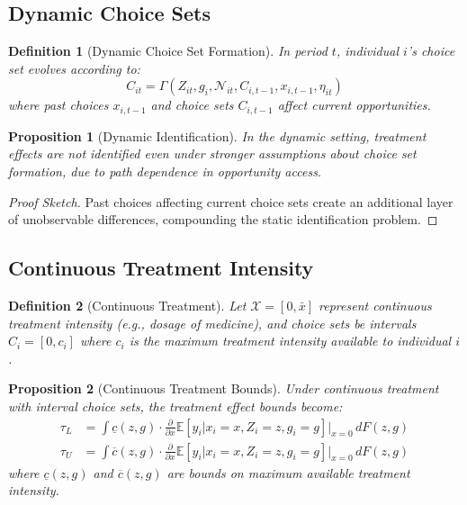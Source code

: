 \documentclass{article}
\newtheorem{proposition}{Proposition}
\newtheorem{definition}{Definition}
\newcommand{\E}{\mathbb{E}}
\newcommand{\X}{\mathcal{X}}
\begin{document}
\subsection{Dynamic Choice Sets}

\begin{definition}[Dynamic Choice Set Formation]
In period $t$, individual $i$'s choice set evolves according to:
\begin{equation}
C_{it} = \Gamma(Z_{it}, g_i, \mathcal{N}_{it}, C_{i,t-1}, x_{i,t-1}, \eta_{it}) %
\end{equation}
where past choices $x_{i,t-1}$ and choice sets $C_{i,t-1}$ affect current opportunities.
\end{definition}

\begin{proposition}[Dynamic Identification]
In the dynamic setting, treatment effects are not identified even under stronger assumptions about choice set formation, due to path dependence in opportunity access. %
\end{proposition}

\begin{proof}[Proof Sketch]
Past choices affecting current choice sets create an additional layer of unobservable differences, compounding the static identification problem.
\end{proof}

\subsection{Continuous Treatment Intensity}

\begin{definition}[Continuous Treatment]
Let $\X = [0, \bar{x}]$ represent continuous treatment intensity (e.g., dosage of medicine), and choice sets be intervals $C_i = [0, c_i]$ where $c_i$ is the maximum treatment intensity available to individual $i$.
\end{definition}

\begin{proposition}[Continuous Treatment Bounds]
Under continuous treatment with interval choice sets, the treatment effect bounds become:
\begin{align}
\tau_L &= \int \underline{c}(z,g) \cdot \frac{\partial}{\partial x} \E[y_i | x_i = x, Z_i = z, g_i = g]\Big|_{x=0} \, dF(z,g) \\
\tau_U &= \int \overline{c}(z,g) \cdot \frac{\partial}{\partial x} \E[y_i | x_i = x, Z_i = z, g_i = g]\Big|_{x=0} \, dF(z,g)
\end{align}
where $\underline{c}(z,g)$ and $\overline{c}(z,g)$ are bounds on maximum available treatment intensity. %
\end{proposition}
\end{document}
